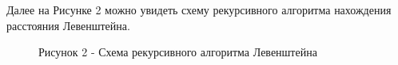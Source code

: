\documentclass[12pt]{report}
\begin{document}
\newpage
Далее на Рисунке 2 можно увидеть схему рекурсивного алгоритма нахождения расстояния Левенштейна.
\begin{figure}[h!]
	\caption*{Рисунок 2 - Схема рекурсивного алгоритма Левенштейна}
\end{figure}
\end{document}
